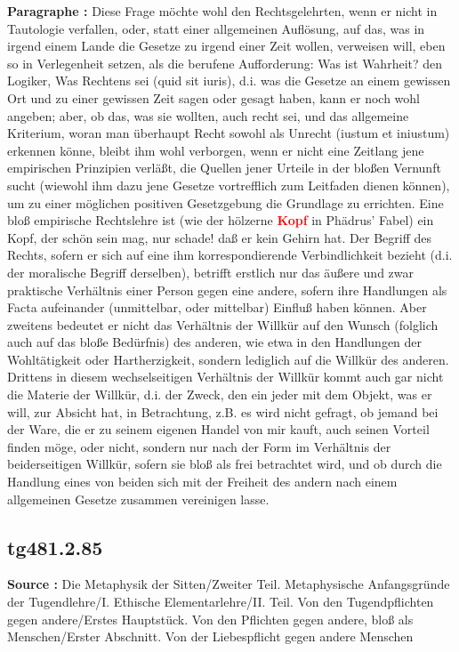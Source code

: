 \documentclass[a4paper,12pt,twoside]{book}
\newcommand{\match}[1]{\textcolor{red}{\textbf{#1}}}
\begin{document}
	\textbf{Paragraphe : }Diese Frage möchte wohl den Rechtsgelehrten, wenn er nicht in Tautologie verfallen, oder, statt einer allgemeinen Auflösung, auf das, was in irgend einem Lande die Gesetze zu irgend einer Zeit wollen, verweisen will, eben so in Verlegenheit setzen, als die berufene Aufforderung: Was ist Wahrheit? den Logiker, Was Rechtens sei (quid sit iuris), d.i. was die Gesetze an einem gewissen Ort und zu einer gewissen Zeit sagen oder gesagt haben, kann er noch wohl angeben; aber, ob das, was sie wollten, auch recht sei, und das allgemeine Kriterium, woran man überhaupt Recht sowohl als Unrecht (iustum et iniustum) erkennen könne, bleibt ihm wohl verborgen, wenn er nicht eine Zeitlang jene empirischen Prinzipien verläßt, die Quellen jener Urteile in der bloßen Vernunft sucht (wiewohl ihm dazu jene Gesetze vortrefflich zum Leitfaden dienen können), um zu einer möglichen positiven Gesetzgebung die Grundlage zu errichten. Eine bloß empirische Rechtslehre ist (wie der hölzerne \match{Kopf} in Phädrus' Fabel) ein Kopf, der schön sein mag, nur schade! daß er kein Gehirn hat.  Der Begriff des Rechts, sofern er sich auf eine ihm korrespondierende Verbindlichkeit bezieht (d.i. der moralische Begriff derselben), betrifft erstlich nur das äußere und zwar praktische Verhältnis einer Person gegen eine andere, sofern ihre Handlungen als Facta aufeinander (unmittelbar, oder mittelbar) Einfluß haben können. Aber zweitens bedeutet er nicht das Verhältnis der Willkür auf den Wunsch (folglich auch auf das bloße Bedürfnis) des anderen, wie etwa in den Handlungen der Wohltätigkeit oder Hartherzigkeit, sondern lediglich auf die Willkür des anderen. Drittens in diesem wechselseitigen Verhältnis der Willkür kommt auch gar nicht die Materie der Willkür, d.i. der Zweck, den ein jeder mit dem Objekt, was er will, zur Absicht hat, in Betrachtung, z.B. es wird nicht gefragt, ob jemand bei der Ware, die er zu seinem eigenen Handel von mir kauft, auch seinen Vorteil finden möge, oder nicht, sondern nur nach der Form im Verhältnis der beiderseitigen Willkür, sofern sie bloß als frei betrachtet wird, und ob durch die Handlung eines von beiden sich mit der Freiheit des andern nach einem allgemeinen Gesetze zusammen vereinigen lasse. 
	
	\subsection*{tg481.2.85} 
	\textbf{Source : }Die Metaphysik der Sitten/Zweiter Teil. Metaphysische Anfangsgründe der Tugendlehre/I. Ethische Elementarlehre/II. Teil. Von den Tugendpflichten gegen andere/Erstes Hauptstück. Von den Pflichten gegen andere, bloß als Menschen/Erster Abschnitt. Von der Liebespflicht gegen andere Menschen\\  
	
\end{document}
